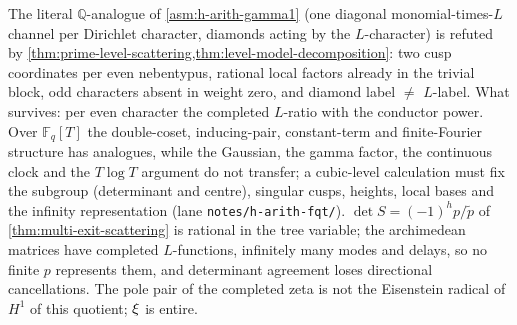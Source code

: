 \begin{observation}
\label{obs:h-arith-q-verdict}
The literal $\mathbb Q$-analogue of \cref{asm:h-arith-gamma1} (one diagonal monomial-times-$L$ channel per Dirichlet character,
diamonds acting by the $L$-character) is refuted by \cref{thm:prime-level-scattering,thm:level-model-decomposition}:
two cusp coordinates per even nebentypus, rational local factors already in the trivial block, odd characters absent
in weight zero, and diamond label $\ne$ $L$-label. What survives: per even character the completed $L$-ratio with the
conductor power. Over $\mathbb F_q[T]$ the double-coset, inducing-pair, constant-term and finite-Fourier structure has
analogues, while the Gaussian, the gamma factor, the continuous clock and the $T\log T$ argument do not transfer; a
cubic-level calculation must fix the subgroup (determinant and centre), singular cusps, heights, local bases and the
infinity representation (lane \texttt{notes/h-arith-fqt/}). $\det S = (-1)^hp/\tilde p$ of \cref{thm:multi-exit-scattering} is
rational in the tree variable; the archimedean matrices have completed $L$-functions, infinitely many modes and
delays, so no finite $p$ represents them, and determinant agreement loses directional cancellations. The pole pair of
the completed zeta is not the Eisenstein radical of $H^1$ of this quotient; $\xi$ is entire.
\end{observation}

